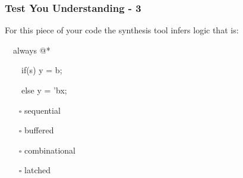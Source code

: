 \documentclass[t, notes, xcolor=table]{beamer}
\begin{document}
\begin{frame}
\frametitle{Test You Understanding - 3}

For this piece of your code the synthesis tool infers logic that is:

\ \ always @*
  
\ \ \ \ if(s) y = b;
    
\ \ \ \ else y = 'bx;
\begin{itemize}
\item[$\square$] sequential
\item[$\square$] buffered
\item[$\square$] combinational
\item[$\square$] latched
\end{itemize}
\end{frame}
\end{document}
